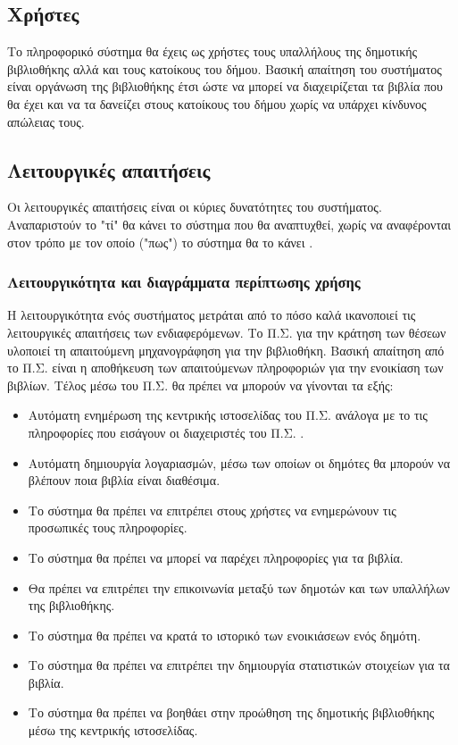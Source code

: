 \documentclass{assignment}
\begin{document}
\subsection{Χρήστες}

Το πληροφορικό σύστημα θα έχεις ως χρήστες τους υπαλλήλους της δημοτικής βιβλιοθήκης αλλά και τους κατοίκους του δήμου. Βασική απαίτηση του συστήματος είναι οργάνωση της βιβλιοθήκης έτσι ώστε να μπορεί να διαχειρίζεται τα βιβλία που θα έχει και να τα δανείζει στους κατοίκους του δήμου χωρίς να υπάρχει κίνδυνος απώλειας τους.

\subsection{Λειτουργικές απαιτήσεις}

Οι λειτουργικές απαιτήσεις είναι οι κύριες δυνατότητες του συστήματος. Αναπαριστούν το "τί" θα κάνει το σύστημα που θα αναπτυχθεί, χωρίς να αναφέρονται στον τρόπο με τον οποίο ("πως") το σύστημα θα το κάνει \cite{triadis}.

\subsubsection{Λειτουργικότητα και διαγράμματα περίπτωσης χρήσης}
\label{subsubsection: business_use_case}

Η λειτουργικότητα ενός συστήματος μετράται από το πόσο καλά ικανοποιεί τις λειτουργικές απαιτήσεις των ενδιαφερόμενων. Το Π.Σ. για την κράτηση των θέσεων υλοποιεί τη απαιτούμενη μηχανογράφηση για την βιβλιοθήκη. Βασική απαίτηση από το Π.Σ. είναι η αποθήκευση των απαιτούμενων πληροφοριών για την ενοικίαση των βιβλίων. Τέλος μέσω του Π.Σ. θα πρέπει να μπορούν να γίνονται τα εξής:

\begin{itemize}
\item Αυτόματη ενημέρωση της κεντρικής ιστοσελίδας του Π.Σ. ανάλογα με το τις πληροφορίες που εισάγουν οι διαχειριστές του Π.Σ. .
\item Αυτόματη δημιουργία λογαριασμών, μέσω των οποίων οι δημότες θα μπορούν να βλέπουν ποια βιβλία είναι διαθέσιμα.
\item Το σύστημα θα πρέπει να επιτρέπει στους χρήστες να ενημερώνουν τις προσωπικές τους πληροφορίες.
\item Το σύστημα θα πρέπει να μπορεί να παρέχει πληροφορίες για τα βιβλία.
\item Θα πρέπει να επιτρέπει την επικοινωνία μεταξύ των δημοτών και των υπαλλήλων της βιβλιοθήκης. 
\item Το σύστημα θα πρέπει να κρατά το ιστορικό των ενοικιάσεων ενός δημότη.
\item Το σύστημα θα πρέπει να επιτρέπει την δημιουργία στατιστικών στοιχείων για τα βιβλία.
\item Το σύστημα θα πρέπει να βοηθάει στην προώθηση της δημοτικής βιβλιοθήκης μέσω της κεντρικής ιστοσελίδας.
\end{itemize}
\end{document}
